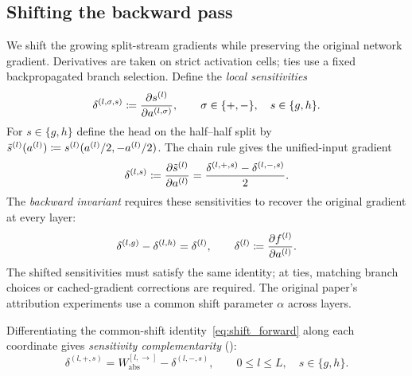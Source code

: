 \subsection{Shifting the backward pass}\label{subsec:backward_stabilization}

We shift the growing split-stream gradients while preserving the original network gradient. Derivatives are taken on strict activation cells; ties use a fixed backpropagated branch selection. Define the \emph{local sensitivities}
\begin{equation}
    \delta^{(l,\sigma,s)}\coloneqq\frac{\partial s^{(l)}}{\partial a^{(l,\sigma)}},
    \qquad \sigma\in\{+,-\},\quad s\in\{g,h\}.
    \label{eq:local_sensitivities}
\end{equation}
For $s\in\{g,h\}$ define the head on the half--half split by $\tilde s^{(l)}(a^{(l)})\coloneqq s^{(l)}(a^{(l)}/2,-a^{(l)}/2)$. The chain rule gives the unified-input gradient
\begin{equation}
\delta^{(l,s)}\coloneqq\frac{\partial\tilde s^{(l)}}{\partial a^{(l)}}
=\frac{\delta^{(l,+,s)}-\delta^{(l,-,s)}}2.
\label{eq:unified_split_gradients}
\end{equation}
The \emph{backward invariant} requires these sensitivities to recover the original gradient at every layer:
\begin{equation}
\delta^{(l,g)}-\delta^{(l,h)}=\delta^{(l)},
\qquad
\delta^{(l)}\coloneqq\frac{\partial f^{(l)}}{\partial a^{(l)}}.
\label{eq:stabilization_backward_invariant}
\end{equation}
The shifted sensitivities must satisfy the same identity; at ties, matching branch choices or cached-gradient corrections are required. The original paper's attribution experiments use a common shift parameter $\alpha$ across layers.

Differentiating the common-shift identity~\eqref{eq:shift_forward} along each coordinate gives \emph{sensitivity complementarity} ():
\begin{equation}
    \delta^{(l,+,s)}=W_{\mathrm{abs}}^{[l,\rightarrow]}-\delta^{(l,-,s)},
    \qquad 0\le l\le L,\quad s\in\{g,h\}.
    \label{eq:delta_complementarity}
\end{equation}

